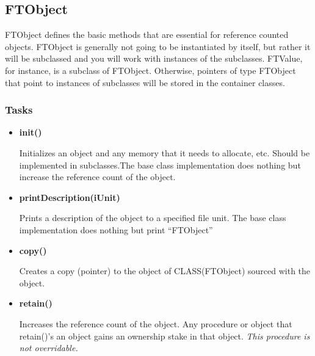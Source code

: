 \documentclass[9pt]{article}
\begin{document}
\subsection{FTObject}

 FTObject defines the basic methods that are essential for reference counted objects.
FTObject is generally not going to be instantiated by itself, but rather it will 
 be subclassed and you will work with instances of the subclasses. FTValue, for instance,
 is a subclass of FTObject.
 Otherwise, pointers of type FTObject that point to instances of subclasses
 will be stored in the container classes.


 \subsubsection{Tasks}
\begin{itemize}
\item {\bf init()}

      Initializes an object and any memory that it needs to allocate, etc. 
      Should be implemented in subclasses.The base class implementation does nothing but
      increase the reference count of the object.

%

\item {\bf printDescription(iUnit)}

      Prints a description of the object to a specified file unit. The base class implementation
      does nothing but print ``FTObject''

\item{\bf  copy()}

      Creates a copy (pointer) to the object of CLASS(FTObject) sourced with the object.

\item {\bf retain()}

      Increases the reference count of the object. Any procedure or object that retain()'s
      an object gains an ownership stake in that object. \emph{This procedure is not overridable.}


\end{itemize}
\end{document}
